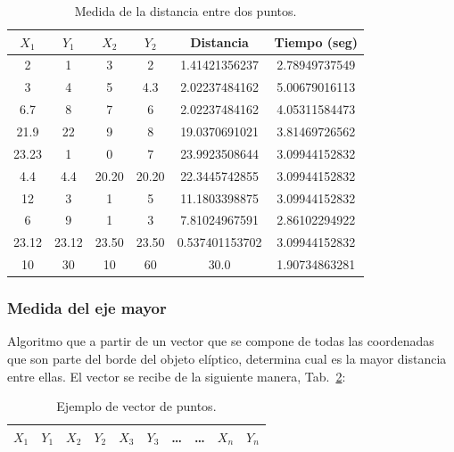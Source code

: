 \begin{table}[ht!]
	\centering
	\begin{tabular}{c|c|c|c|c|c}
		$X_1$ & $Y_1$ & $X_2$ & $Y_2$ & Distancia & Tiempo (seg) \\\hline\hline
		2     & 1     & 3     & 2     & 1.41421356237  & 2.78949737549 \\\hline
		3     & 4     & 5     & 4.3   & 2.02237484162  & 5.00679016113 \\\hline
		6.7   & 8     & 7     & 6     & 2.02237484162  & 4.05311584473 \\\hline
		21.9  & 22    & 9     & 8     & 19.0370691021  & 3.81469726562 \\\hline
		23.23 & 1     & 0     & 7     & 23.9923508644  & 3.09944152832 \\\hline
		4.4   & 4.4   & 20.20 & 20.20 & 22.3445742855  & 3.09944152832 \\\hline
		12    & 3     & 1     & 5     & 11.1803398875  & 3.09944152832 \\\hline
		6     & 9     & 1     & 3     & 7.81024967591  & 2.86102294922 \\\hline
		23.12 & 23.12 & 23.50 & 23.50 & 0.537401153702 & 3.09944152832 \\\hline
		10    & 30    & 10    & 60    & 30.0           & 1.90734863281 \\
	\end{tabular}
	\caption{Medida de la distancia entre dos puntos.}
	\label{tab:mde2p}
\end{table}

\subsubsection{Medida del eje mayor}

Algoritmo que a partir de un vector que se compone de todas las coordenadas que son parte del borde del objeto elíptico, determina cual es la mayor distancia entre ellas. El vector se recibe de la siguiente manera, Tab.~\ref{tab:evp}:

\begin{table}[ht!]
	\centering
	\begin{tabular}{|c|c|c|c|c|c|c|c|c|c|}\hline
		$X_1$ & $Y_1$ & $X_2$ & $Y_2$ & $X_3$ & $Y_3$ & \ldots & \ldots & $X_n$ & $Y_n$ \\\hline
	\end{tabular}
	\caption{Ejemplo de vector de puntos.}
	\label{tab:evp}
\end{table}

